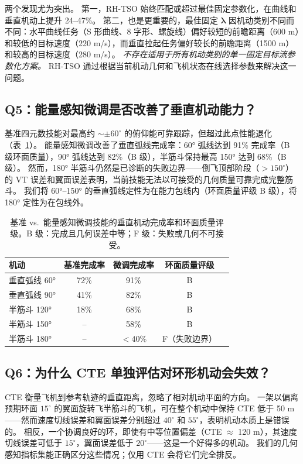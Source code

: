 \documentclass{article}
\begin{document}
两个发现尤为突出。
第一，RH-TSO 始终匹配或超过最佳固定参数化，在曲线和垂直机动上提升 24--47\%。
第二，也是更重要的，最佳固定 $\bm{\lambda}$ 因机动类别不同而不同：水平曲线任务（S 形曲线、8 字形、螺旋线）偏好较短的前瞻距离（600 m）和较低的目标速度（220 m/s），而垂直拉起任务偏好较长的前瞻距离（1500 m）和较高的目标速度（280 m/s）。
\emph{不存在适用于所有机动类别的单一固定目标流参数化方案。}
RH-TSO 通过根据当前机动几何和飞机状态在线选择参数来解决这一问题。

\subsection{Q5：能量感知微调是否改善了垂直机动能力？}

基准四元数技能对最高约 $\sim\pm60^\circ$ 的俯仰能可靠跟踪，但超过此点性能退化（表~\ref{tab:vertical}）。
能量感知微调改善了垂直弧线完成率：60° 弧线达到 91\% 完成率（B 级环面质量），90° 弧线达到 82\%（B 级），半筋斗保持最高 150° 达到 68\%（B 级）。
然而，180° 半筋斗仍然是已诊断的失败边界——倒飞顶部阶段（$>150^\circ$）的 VT 误差和翼面误差表明，当前技能无法以可接受的几何质量可靠完成完整筋斗。
我们将 60°--150° 的垂直弧线定性为在能力包线内（环面质量评级 B 级），将 180° 定性为在包线外。

\begin{table}[t]
\caption{基准 vs.\ 能量感知微调技能的垂直机动完成率和环面质量评级。B 级：完成且几何误差中等；F 级：失败或几何不可接受。}
\label{tab:vertical}
\centering
\begin{tabular}{lcccc}
  \hline
  \textbf{机动} & \textbf{基准完成率} & \textbf{微调完成率} & \textbf{环面质量评级} \\
  \hline
  垂直弧线 60°  & 72\% & 91\% & B \\
  垂直弧线 90°  & 41\% & 82\% & B \\
  半筋斗 120°   & 18\% & 68\% & B \\
  半筋斗 150°   & --   & 58\% & B \\
  半筋斗 180°   & --   & $<40\%$ & F（失败边界） \\
  \hline
\end{tabular}
\end{table}

\subsection{Q6：为什么 CTE 单独评估对环形机动会失效？}

CTE 衡量飞机到参考轨迹的垂直距离，忽略了相对机动平面的方向。
一架以偏离预期环面 $15^\circ$ 的翼面旋转飞半筋斗的飞机，可在整个机动中保持 CTE 低于 50 m——然而速度切线误差和翼面误差分别超过 $40^\circ$ 和 $55^\circ$，表明机动本质上是错误的。
相反，一个协调良好的环，即使有中等位置偏差（CTE $\approx$ 120 m），其速度切线误差可低于 $15^\circ$，翼面误差低于 $20^\circ$——这是一个好得多的机动。
我们的几何感知指标集能正确区分这些情况；仅用 CTE 会将它们完全排反。
\end{document}
